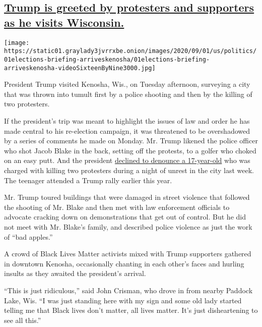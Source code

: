 \hypertarget{trump-is-greeted-by-protesters-and-supporters-as-he-visits-wisconsin}{%
\subsection{\texorpdfstring{\protect\hyperlink{trump-is-greeted-by-protesters-and-supporters-as-he-visits-wisconsin}{Trump
is greeted by protesters and supporters as he visits
Wisconsin.}}{Trump is greeted by protesters and supporters as he visits Wisconsin.}}\label{trump-is-greeted-by-protesters-and-supporters-as-he-visits-wisconsin}}

\texttt{[image: https://static01.graylady3jvrrxbe.onion/images/2020/09/01/us/politics/01elections-briefing-arriveskenosha/01elections-briefing-arriveskenosha-videoSixteenByNine3000.jpg]}

President Trump visited Kenosha, Wis., on Tuesday afternoon, surveying a
city that was thrown into tumult first by a police shooting and then by
the killing of two protesters.

If the president's trip was meant to highlight the issues of law and
order he has made central to his re-election campaign, it was threatened
to be overshadowed by a series of comments he made on Monday. Mr. Trump
likened the police officer who shot Jacob Blake in the back, setting off
the protests, to a golfer who choked on an easy putt. And the president
\href{https://www.nytimes3xbfgragh.onion/live/2020/08/31/us/trump-vs-biden\#president-trump-calls-his-supporters-peaceful-and-defends-a-17-year-old-who-shot-three-people-in-wisconsin}{declined
to denounce a 17-year-old} who was charged with killing two protesters
during a night of unrest in the city last week. The teenager attended a
Trump rally earlier this year.

Mr. Trump toured buildings that were damaged in street violence that
followed the shooting of Mr. Blake and then met with law enforcement
officials to advocate cracking down on demonstrations that get out of
control. But he did not meet with Mr. Blake's family, and described
police violence as just the work of ``bad apples.''

A crowd of Black Lives Matter activists mixed with Trump supporters
gathered in downtown Kenosha, occasionally chanting in each other's
faces and hurling insults as they awaited the president's arrival.

``This is just ridiculous,'' said John Crisman, who drove in from nearby
Paddock Lake, Wis. ``I was just standing here with my sign and some old
lady started telling me that Black lives don't matter, all lives matter.
It's just disheartening to see all this.''

